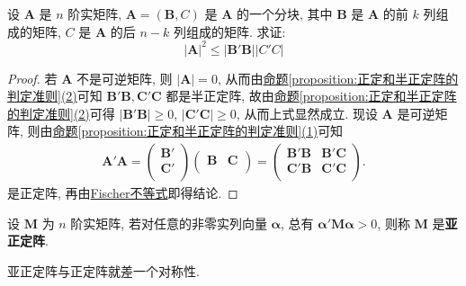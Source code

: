 \documentclass[../../main.tex]{subfiles}%
\begin{document}
\begin{proposition}
设 \(\boldsymbol{A}\) 是 \(n\) 阶实矩阵, \(\boldsymbol{A}=(\boldsymbol{B},C)\) 是 \(\boldsymbol{A}\) 的一个分块, 其中 \(\boldsymbol{B}\) 是 \(\boldsymbol{A}\) 的前 \(k\) 列组成的矩阵, \(C\) 是 \(\boldsymbol{A}\) 的后 \(n - k\) 列组成的矩阵. 求证:
\[|\boldsymbol{A}|^2\leqslant |\boldsymbol{B}'\boldsymbol{B}||C'C|\]
\end{proposition}
\begin{proof}
若 \(\boldsymbol{A}\) 不是可逆矩阵, 则 \(|\boldsymbol{A}| = 0\), 从而由\hyperref[proposition:正定和半正定阵的判定准则]{命题\ref{proposition:正定和半正定阵的判定准则}(2)}可知 \(\boldsymbol{B}'\boldsymbol{B},\boldsymbol{C}'\boldsymbol{C}\) 都是半正定阵, 故由\hyperref[proposition:正定和半正定阵的判定准则]{命题\ref{proposition:正定和半正定阵的判定准则}(2)}可得 \(|\boldsymbol{B}'\boldsymbol{B}|\geqslant 0\), \(|\boldsymbol{C}'\boldsymbol{C}|\geqslant 0\), 从而上式显然成立. 现设 \(\boldsymbol{A}\) 是可逆矩阵, 则由\hyperref[proposition:正定和半正定阵的判定准则]{命题\ref{proposition:正定和半正定阵的判定准则}(1)}可知
\begin{align*}
\boldsymbol{A}' \boldsymbol{A}=\left( \begin{array}{c}
\boldsymbol{B}'\\
\boldsymbol{C}'\\
\end{array} \right) \left( \begin{matrix}
\boldsymbol{B}&		\boldsymbol{C}\\
\end{matrix} \right) =\left( \begin{matrix}
\boldsymbol{B}' \boldsymbol{B}&		\boldsymbol{B}' \boldsymbol{C}\\
\boldsymbol{C}' \boldsymbol{B}&		\boldsymbol{C}' \boldsymbol{C}\\
\end{matrix} \right) .
\end{align*}
是正定阵, 再由\hyperref[proposition:Fischer不等式]{Fischer不等式}即得结论. 
\end{proof}

\begin{definition}[亚正定阵]
设 \(\boldsymbol{M}\) 为 \(n\) 阶实矩阵, 若对任意的非零实列向量 \(\boldsymbol{\alpha}\), 总有 \(\boldsymbol{\alpha}'\boldsymbol{M}\boldsymbol{\alpha}>0\), 则称 \(\boldsymbol{M}\) 是\textbf{亚正定阵}. 
\end{definition}
\begin{remark}
亚正定阵与正定阵就差一个对称性.
\end{remark}
\end{document}
